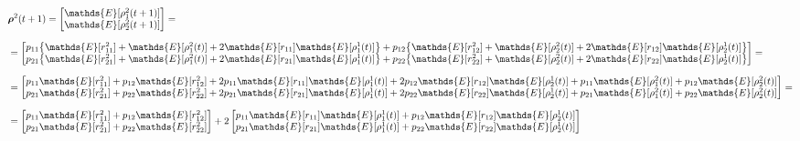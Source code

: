 \documentclass[\main/main.tex]{subfiles}
\begin{document}
\begin{equation}
\setlength{\jot}{10pt}
\begin{split}
    &\bm{\rho}^2(t+1) =    
\begin{bmatrix}
      \mathds{E}[\rho_1^2(t+1)]\\
      \mathds{E}[\rho_2^2(t+1)]\\
\end{bmatrix}= \\
  &= 
 \begin{bmatrix} 
 p_{11} \big\{ \mathds{E}[r^2_{11}]  + \mathds{E}[\rho_1^2(t)] + 2\mathds{E}[r_{11}]\mathds{E}[\rho_1^1(t)]  \big\} + 
 p_{12}\big\{ \mathds{E}[r^2_{12}]  + \mathds{E}[\rho_2^2(t)]+ 2\mathds{E}[r_{12}]\mathds{E}[\rho_2^1(t)] \big\} \\
  p_{21} \big\{ \mathds{E}[r^2_{21}]  + \mathds{E}[\rho_1^2(t)] + 2\mathds{E}[r_{21}]\mathds{E}[\rho_1^1(t)] \big\} +
  p_{22}\big\{ \mathds{E}[r^2_{22}]  + \mathds{E}[\rho_2^2(t)]+ 2\mathds{E}[r_{22}]\mathds{E}[\rho_2^1(t)]  \big\} \\
 \end{bmatrix} =\\
  &=  
 \begin{bmatrix} 
 p_{11}\mathds{E}[r^2_{11}]  +  p_{12}\mathds{E}[r^2_{12}] + 2p_{11}\mathds{E}[r_{11}]\mathds{E}[\rho_1^1(t)] + 2p_{12}\mathds{E}[r_{12}]\mathds{E}[\rho_2^1(t)] +  p_{11}\mathds{E}[\rho_1^2(t)] +  p_{12}\mathds{E}[\rho_2^2(t)]\\
 p_{21}\mathds{E}[r^2_{21}]  +  p_{22}\mathds{E}[r^2_{22}] + 2p_{21}\mathds{E}[r_{21}]\mathds{E}[\rho_1^1(t)] + 2p_{22}\mathds{E}[r_{22}]\mathds{E}[\rho_2^1(t)] +  p_{21}\mathds{E}[\rho_1^2(t)] +  p_{22}\mathds{E}[\rho_2^2(t)]\\
 \end{bmatrix} =\\
  &=  
 \begin{bmatrix} 
 p_{11}\mathds{E}[r^2_{11}]  +  p_{12}\mathds{E}[r^2_{12}]\\
 p_{21}\mathds{E}[r^2_{21}] + p_{22} \mathds{E}[r^2_{22}]\\
 \end{bmatrix}
 + 2
 \begin{bmatrix} 
 p_{11}\mathds{E}[r_{11}] \mathds{E}[\rho_1^1(t)] +  p_{12}\mathds{E}[r_{12}]\mathds{E}[\rho_2^1(t)]\\
 p_{21}\mathds{E}[r_{21}] \mathds{E}[\rho_1^1(t)] +  p_{22}\mathds{E}[r_{22}]\mathds{E}[\rho_2^1(t)]\\
 \end{bmatrix}

\end{split}
\end{equation}
\end{document}

